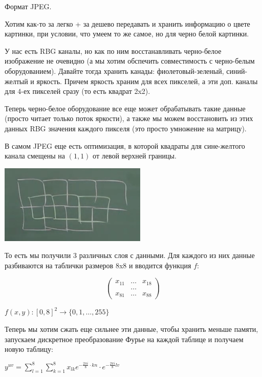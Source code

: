 \begin{remark}
    Формат JPEG.


    Хотим как-то за легко + за дешево передавать и хранить информацию о цвете картинки, при условии, что умеем то же самое, но для черно белой картинки.

    У нас есть RBG каналы, но как по ним восстанавливать черно-белое изображение не очевидно (а мы хотим обспечить совместимость с черно-белым оборудованием). Давайте тогда хранить канады: фиолетовый-зеленый, синий-желтый и яркость. Причем яркость храним для всех пикселей, а эти доп. каналы для $4$-ех пикселей сразу (то есть квадрат 2x2). 

    Теперь черно-белое оборудование все еще может обрабатывать такие данные (просто читает только поток яркости), а также мы можем восстановить из этих данных RBG значения каждого пикселя (это просто умножение на матрицу).

    В самом JPEG еще есть оптимизация, в которой квадраты для сине-желтого канала смещены на $(1, 1)$ от левой верхней границы.

    \begin{center}
        \includegraphics[width=7cm]{assets/05-fourierreihe/jpeg.png}
    \end{center}

    То есть мы получили 3 различных слоя с данными. Для каждого из них данные разбиваются на таблички размеров 8x8 и вводится функция $f$:
    
    $$\begin{pmatrix}
        x_{11} & \ldots & x_{18} \\
        & \ldots \\
        x_{81} & \ldots & x_{88}
    \end{pmatrix}$$

    $f(x, y): [0, 8]^2 \to \{ 0, 1, \ldots, 255 \}$

    Теперь мы хотим сжать еще сильнее эти данные, чтобы хранить меньше памяти, запускаем дискретное преобразование Фурье на каждой таблице и получаем новую таблицу:
    
    $y^{uv} = \sum_{l=1}^{8} \sum_{k=1}^{8} x_{lk} e^{- \frac{2 \pi i}{8} \cdot kn} \cdot e^{- \frac{2 \pi i}{8} l v}$


\end{remark}
